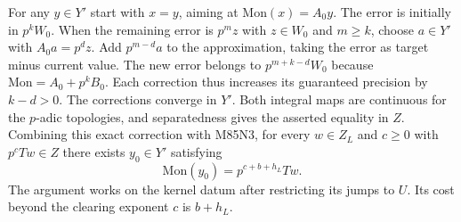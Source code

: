 For any $y\in Y'$ start with $x=y$, aiming at
$\mathrm{Mon}(x)=A_0 y$. The error is initially in $p^kW_0$.
When the remaining error is $p^m z$ with $z\in W_0$ and $m\ge k$,
choose $a\in Y'$ with $A_0a=p^d z$. Add $p^{m-d}a$ to the
approximation, taking the error as target minus current value.
The new error belongs to $p^{m+k-d}W_0$ because
$\mathrm{Mon}=A_0+p^kB_0$. Each correction thus increases
its guaranteed precision by $k-d>0$. The corrections converge
in $Y'$. Both integral maps are continuous for the $p$-adic
topologies, and separatedness gives the asserted equality in $Z$.
Combining this exact correction with M85N3, for every
$w\in Z_L$ and $c\ge0$ with $p^cTw\in Z$ there exists
$y_0\in Y'$ satisfying
\[
                \mathrm{Mon}(y_0)=p^{c+b+h_L}Tw .
\]
The argument works on the kernel datum after restricting its jumps
to $U$. Its cost beyond the clearing exponent $c$ is $b+h_L$.
